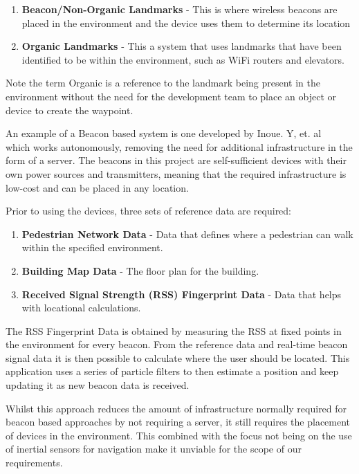 \documentclass[12pt,a4paper]{report}
\begin{document}
\begin{enumerate}
	\item \textbf{Beacon/Non-Organic Landmarks} - This is where wireless beacons are placed in the environment and the device uses them to determine its location
	\item \textbf{Organic Landmarks} - This a system that uses landmarks that have been identified to be within the environment, such as WiFi routers and elevators.
\end{enumerate}

Note the term Organic is a reference to the landmark being present in the environment without the need for the development team to place an object or device to create the waypoint.

An example of a Beacon based system is one developed by Inoue. Y, et. al ~\cite{Inoue2009} which works autonomously, removing the need for additional infrastructure in the form of a server. The beacons in this project are self-sufficient devices with their own power sources and transmitters, meaning that the required infrastructure is low-cost and can be placed in any location.

Prior to using the devices, three sets of reference data are required:

\begin{enumerate}
	\item \textbf{Pedestrian Network Data} - Data that defines where a pedestrian can walk within the specified environment.
	\item \textbf{Building Map Data} - The floor plan for the building.
	\item \textbf{Received Signal Strength (RSS) Fingerprint Data} - Data that helps with locational calculations.
\end{enumerate}

The RSS Fingerprint Data is obtained by measuring the RSS at fixed points in the environment for every beacon. From the reference data and real-time beacon signal data it is then possible to calculate where the user should be located. This application uses a series of particle filters to then estimate a position and keep updating it as new beacon data is received.

Whilst this approach reduces the amount of infrastructure normally required for beacon based approaches by not requiring a server, it still requires the placement of devices in the environment. This combined with the focus not being on the use of inertial sensors for navigation make it unviable for the scope of our requirements.
\end{document}
